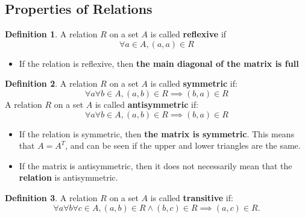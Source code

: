 \documentclass[article, 12pt]{article}
\theoremstyle{definition}
\newtheorem{definition}{Definition}[subsection]
\begin{document}
    \subsection{Properties of Relations}
    \begin{definition}
    \label{def:reflexive}
        A relation $R$ on a set $A$ is called \textbf{reflexive} if
        \begin{equation}
            \forall a \in A, (a,a) \in R
        \end{equation}
    \end{definition}
    \begin{itemize}
        \item If the relation is reflexive, then \textbf{the main diagonal of the matrix is full}
    \end{itemize}
    \begin{definition}
    \label{def:symmetric and antisymmetric}
        A relation $R$ on a set $A$ is called \textbf{symmetric} if:
        \begin{equation}
            \forall a \forall b \in A, (a,b) \in R \implies (b,a) \in R
        \end{equation}
        A relation $R$ on a set $A$ is called \textbf{antisymmetric} if:
        \begin{equation}
            \forall a \forall b \in A, (a,b) \in R \implies (b,a) \in R
        \end{equation}
    \end{definition}
    \begin{itemize}
        \item If the relation is symmetric, then \textbf{the matrix is symmetric}. This means that $A = A^T$, and can be seen if the upper and lower triangles are the same.
        \item If the matrix is antisymmetric, then it does not necessarily mean that the \textbf{relation} is antisymmetric.
    \end{itemize} 
    \begin{definition}
    \label{def:transitive}
        A relation $R$ on a set $A$ is called \textbf{transitive} if:
         \begin{equation}
            \forall a \forall b \forall c \in A, (a,b) \in R \land (b,c) \in R \implies (a,c) \in R.
         \end{equation}
    \end{definition}
\end{document}
